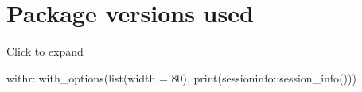 \documentclass[]{book}
\newenvironment{Shaded}{}{}
\newcommand{\DataTypeTok}[1]{#1}
\newcommand{\DecValTok}[1]{#1}
\newcommand{\KeywordTok}[1]{\textcolor[rgb]{0.00,0.00,1.00}{#1}}
\newcommand{\NormalTok}[1]{#1}
\newcommand{\OperatorTok}[1]{#1}
\begin{document}
\hypertarget{package-versions-used}{%
\section*{Package versions used}\label{package-versions-used}}

Click to expand

\begin{Shaded}
\begin{Highlighting}[]
\NormalTok{withr}\OperatorTok{::}\KeywordTok{with_options}\NormalTok{(}\KeywordTok{list}\NormalTok{(}\DataTypeTok{width =} \DecValTok{80}\NormalTok{), }\KeywordTok{print}\NormalTok{(sessioninfo}\OperatorTok{::}\KeywordTok{session_info}\NormalTok{()))}
\end{Highlighting}
\end{Shaded}
\end{document}
